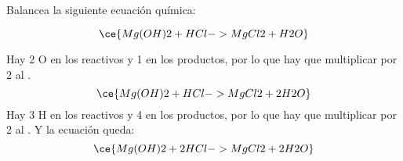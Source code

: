 Balancea la siguiente ecuación química:

\[
    \ce{Mg(OH)2 + HCl -> MgCl2 + H2O}
\]

\begin{solutionbox}{5cm}
    Hay  2 O en los reactivos y 1 en los productos, por lo que hay que multiplicar por 2 al .
    \[
        \ce{Mg(OH)2 + HCl -> MgCl2 + 2H2O}
    \]
    Hay 3 H en los reactivos y 4 en los productos, por lo que hay que multiplicar por 2 al . Y la ecuación queda:
    \[
        \ce{Mg(OH)2 + 2HCl -> MgCl2 + 2H2O}
    \]
\end{solutionbox}